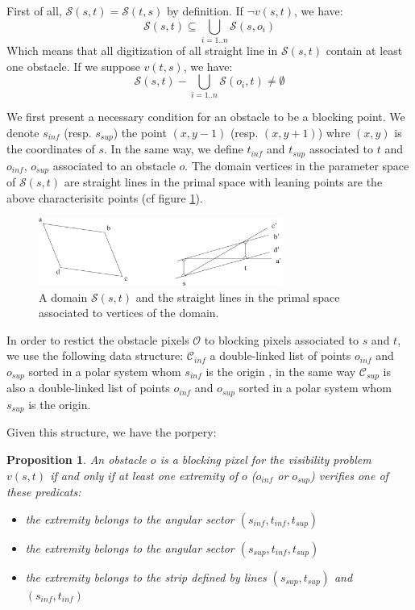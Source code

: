 \documentclass{llncs}
\newtheorem{prop}{Proposition}
\begin{document}
First of all, $\mathcal{S}(s,t)=\mathcal{S}(t,s)$ by definition. If $\neg v(s,t)$, we have:
\begin{displaymath}
  \mathcal{S}(s,t) \subseteq \bigcup_{i=1..n}\mathcal{S}(s,o_i)
\end{displaymath}
Which means that all digitization of all straight line in   $\mathcal{S}(s,t)$ contain at least one
obstacle. If we suppose $v(t,s)$, we have:
\begin{displaymath}
  \mathcal{S}(s,t) - \bigcup_{i=1..n}\mathcal{S}(o_i,t) \neq \emptyset
\end{displaymath}




We first present a necessary condition for an obstacle to be a blocking point. We denote $s_{inf}$
(resp. $s_{sup}$) the point $(x,y-1)$ (resp. $(x,y+1)$) whre $(x,y)$ is the coordinates of $s$. In
the same way, we define $t_{inf}$ and $t_{sup}$ associated to $t$ and $o_{inf}$, $o_{sup}$
associated to an obstacle $o$. The domain vertices in the parameter space of $\mathcal{S}(s,t)$ are
straight lines in the primal space with leaning points are the above characterisitc points (cf
figure \ref{appui}).

\begin{figure}[htbp]
  \begin{center}
    \includegraphics[width=8cm]{appui}
    \caption{A domain $\mathcal{S}(s,t)$ and the straight lines in the primal space associated to
      vertices of the domain.}
    \label{appui}
  \end{center}
\end{figure}

In order to restict the obstacle pixels $\mathcal{O}$ to blocking pixels  associated to $s$ and $t$,
we use the  following data structure: $\mathcal{C}_{inf}$  a double-linked list  of points $o_{inf}$
and $o_{sup}$   sorted  in  a  polar system  whom  $s_{inf}$  is  the   origin ,  in  the  same  way
$\mathcal{C}_{sup}$ is also a double-linked list of points $o_{inf}$ and $o_{sup}$ sorted in a polar
system whom $s_{sup}$ is the origin.

Given this structure, we have the porpery:

\begin{prop}
  An obstacle $o$ is a blocking pixel for the visibility problem $v(s,t)$ if and only if at least
  one extremity of $o$ ($o_{inf}$ or $o_{sup}$) verifies one of these predicats:
\begin{itemize}
  \item the extremity belongs to the angular sector $(s_{inf},t_{inf},t_{sup})$
  \item the extremity belongs to the angular sector $(s_{sup},t_{inf},t_{sup})$
  \item the extremity belongs to the strip defined by lines $(s_{sup},t_{sup})$ and $(s_{inf},t_{inf})$
\end{itemize}
\end{prop}
\end{document}
